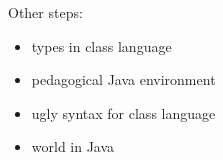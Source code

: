\documentclass[submission,copyright]{eptcs}
\begin{document}
Other steps:
\begin{itemize}
\item types in class language
\item pedagogical Java environment
\item ugly syntax for class language
\item world in Java
\end{itemize}

\cite{dvanhorn:sicp}



\end{document}
